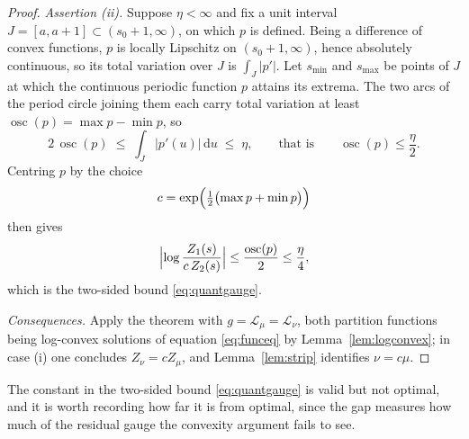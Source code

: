 \documentclass[sn-mathphys-num]{sn-jnl}
\theoremstyle{thmstyleone}%
\theoremstyle{thmstyletwo}%
\theoremstyle{thmstylethree}%
\theoremstyle{thmstyleone}%
\providecommand{\osc}{\operatorname{osc}}
\providecommand{\Leh}{\mathscr{L}}
\providecommand{\dd}{\,\mathrm{d}}
\begin{document}
\begin{appendices}
\begin{proof}
			\emph{Assertion (ii).} Suppose $\eta<\infty$ and fix a unit
			interval $J=[a,a+1]\subset(s_0+1,\infty)$, on which $p$ is
			defined. Being a difference of convex functions, $p$ is locally
			Lipschitz on $(s_0+1,\infty)$, hence absolutely continuous, so its
			total variation over $J$ is $\int_J|p'|$. Let
			$s_{\min}$ and $s_{\max}$ be points of $J$ at which the
			continuous periodic function $p$ attains its extrema. The two arcs
			of the period circle joining them each carry total variation at
			least $\osc(p)=\max p-\min p$, so
			\begin{equation}\label{eq:oscbound}
				2\,\osc(p)\;\le\;\int_J|p'(u)|\dd u\;\le\;\eta,
				\qquad\text{that is}\qquad
				\osc(p)\le\frac{\eta}{2} .
			\end{equation}
			Centring $p$ by the choice
			\begin{equation}\label{eq:centring}
				c=\exp\Bigl(\tfrac12\bigl(\max p+\min p\bigr)\Bigr)
			\end{equation}
			then gives
			\begin{equation}\label{eq:centredbound}
				\Bigl|\log\frac{Z_1(s)}{c\,Z_2(s)}\Bigr|
				\le\frac{\osc(p)}{2}\le\frac{\eta}{4},
			\end{equation}
			which is the two-sided bound \eqref{eq:quantgauge}.
			
			\emph{Consequences.} Apply
			the theorem with $g=\Leh_\mu=\Leh_\nu$, both partition functions
			being log-convex solutions of equation \eqref{eq:funceq} by
			Lemma~\ref{lem:logconvex}; in case (i) one concludes
			$Z_\nu=cZ_\mu$, and Lemma~\ref{lem:strip} identifies $\nu=c\mu$.
		\end{proof}
		
		The constant in the two-sided bound \eqref{eq:quantgauge} is valid but
		not optimal, and it is worth recording how far it is from optimal,
		since the gap measures how much of the residual gauge the convexity
		argument fails to see.
		

\end{appendices}
\end{document}
